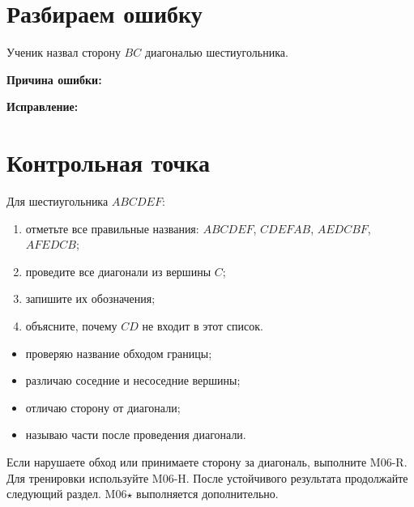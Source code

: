 \section{Разбираем ошибку}

\begin{warningbox}
  Ученик назвал сторону $BC$ диагональю шестиугольника.

  \textbf{Причина ошибки:} \answerblank[100mm]

  \textbf{Исправление:} \answerblank[100mm]
\end{warningbox}

\section{Контрольная точка}

\hexagondiagonalsstudent

\begin{checkpointbox}
  Для шестиугольника $ABCDEF$:
  \begin{enumerate}[label=\textbf{\arabic*.}]
    \item отметьте все правильные названия:
      $ABCDEF$, $CDEFAB$, $AEDCBF$, $AFEDCB$;
    \item проведите все диагонали из вершины $C$;
    \item запишите их обозначения; \answerblank[60mm]
    \item объясните, почему $CD$ не входит в этот список. 
  \end{enumerate}
\end{checkpointbox}

\begin{reflectionbox}
  \begin{itemize}[label=\choicebox]
    \item проверяю название обходом границы;
    \item различаю соседние и несоседние вершины;
    \item отличаю сторону от диагонали;
    \item называю части после проведения диагонали.
  \end{itemize}
\end{reflectionbox}

\begin{resultbox}
  Если нарушаете обход или принимаете сторону за диагональ, выполните M06-R.
  Для тренировки используйте M06-H. После устойчивого результата продолжайте
  следующий раздел. M06\(\star\) выполняется дополнительно.
\end{resultbox}
